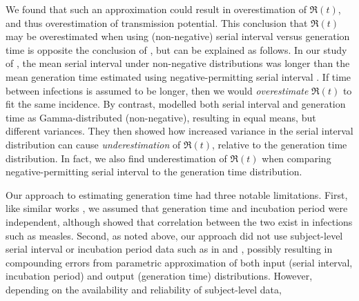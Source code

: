 We found that such an approximation could result in
overestimation of $\Re(t)$,
and thus overestimation of \covid transmission potential.
This conclusion that $\Re(t)$ may be overestimated
when using (non-negative) serial interval versus generation time
is opposite the conclusion of \textcite{Britton2019},
but can be explained as follows.
In our study of \covid,
the mean serial interval under non-negative distributions \cite{Zhang2020,Nishiura2020}
was longer than the mean generation time
estimated using negative-permitting serial interval \cite{Du2020}.
If time between infections is assumed to be longer,
then we would \emph{overestimate} $\Re(t)$ to fit the same incidence.
By contrast, \textcite{Britton2019} modelled
both serial interval and generation time as Gamma-distributed (non-negative),
resulting in equal means, but different variances.
They then showed how increased variance in the serial interval distribution
can cause \emph{underestimation} of $\Re(t)$, relative to the generation time distribution.
In fact, we also find underestimation of $\Re(t)$ when comparing
negative-permitting serial interval to the generation time distribution.
\par
Our approach to estimating generation time had three notable limitations.
First, like similar works \cite{Kuk2005,Ganyani2020}, we assumed that
generation time and incubation period were independent,
although \textcite{Klinkenberg2011} showed that
correlation between the two exist in infections such as measles.
Second, as noted above, our approach did not use
subject-level serial interval or incubation period data
such as in \cite{Ganyani2020} and \cite{Klinkenberg2011},
possibly resulting in compounding errors from
parametric approximation of both input (serial interval, incubation period)
and output (generation time) distributions.
However, depending on the availability and reliability of subject-level data,
